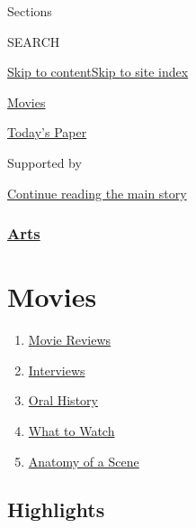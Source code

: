 Sections

SEARCH

\protect\hyperlink{site-content}{Skip to
content}\protect\hyperlink{site-index}{Skip to site index}

\href{https://www.nytimes.com/section/movies}{Movies}

\href{https://myaccount.nytimes.com/auth/login?response_type=cookie\&client_id=vi}{}

\href{https://www.nytimes.com/section/todayspaper}{Today's Paper}

Supported by

\protect\hyperlink{after-sponsor}{Continue reading the main story}

\hypertarget{arts}{%
\subsubsection{\texorpdfstring{\href{arts}{Arts}}{Arts}}\label{arts}}

\hypertarget{movies}{%
\section{Movies}\label{movies}}

\begin{enumerate}
\def\labelenumi{\arabic{enumi}.}
\tightlist
\item
  \href{/reviews/movies}{Movie Reviews}
\item
  \href{/spotlight/interviews}{Interviews}
\item
  \href{/spotlight/oral-history}{Oral History}
\item
  \href{/spotlight/what-to-watch}{What to Watch}
\item
  \href{/column/anatomy-of-a-scene}{Anatomy of a Scene}
\end{enumerate}

\hypertarget{highlights}{%
\subsection{Highlights}\label{highlights}}


